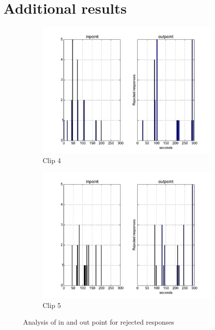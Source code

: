 \section{Additional results}\label{sec:resultsappend}

\begin{figure}[h]
\centering
\begin{subfigure}{.5\textwidth}
  \centering
  \includegraphics[width=\linewidth]{figs/inoutpoint-clip4-rejects.pdf}
  \caption{Clip 4}
  \label{fig:rejectinout4}
\end{subfigure}%
\begin{subfigure}{.5\textwidth}
  \centering
  \includegraphics[width=\linewidth]{figs/inoutpoint-clip5-rejects.pdf}
  \caption{Clip 5}
  \label{fig:rejectinout5}
\end{subfigure}
\caption{Analysis of in and out point for rejected responses}
\label{fig:rejectinout}
\end{figure}

